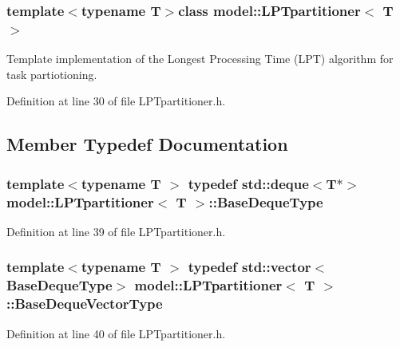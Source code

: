 \subsubsection*{template$<$typename T$>$class model\+::\+L\+P\+Tpartitioner$<$ T $>$}

Template implementation of the Longest Processing Time (L\+P\+T) algorithm for task partiotioning. 

Definition at line 30 of file L\+P\+Tpartitioner.\+h.



\subsection{Member Typedef Documentation}
\hypertarget{classmodel_1_1_l_p_tpartitioner_a29fe16f05a6fed1fb672a28379ec80c2}{}
\subsubsection[{Base\+Deque\+Type}]{\setlength{\rightskip}{0pt plus 5cm}template$<$typename T $>$ typedef std\+::deque$<${\bf T}$\ast$$>$ {\bf model\+::\+L\+P\+Tpartitioner}$<$ {\bf T} $>$\+::{\bf Base\+Deque\+Type}}\label{classmodel_1_1_l_p_tpartitioner_a29fe16f05a6fed1fb672a28379ec80c2}


Definition at line 39 of file L\+P\+Tpartitioner.\+h.

\hypertarget{classmodel_1_1_l_p_tpartitioner_a218d5e533eb5d82b957d5e42898a6a3e}{}
\subsubsection[{Base\+Deque\+Vector\+Type}]{\setlength{\rightskip}{0pt plus 5cm}template$<$typename T $>$ typedef std\+::vector$<${\bf Base\+Deque\+Type}$>$ {\bf model\+::\+L\+P\+Tpartitioner}$<$ {\bf T} $>$\+::{\bf Base\+Deque\+Vector\+Type}}\label{classmodel_1_1_l_p_tpartitioner_a218d5e533eb5d82b957d5e42898a6a3e}


Definition at line 40 of file L\+P\+Tpartitioner.\+h.

\hypertarget{classmodel_1_1_l_p_tpartitioner_aa30ca4660424b257214f77ed1023371d}{}
